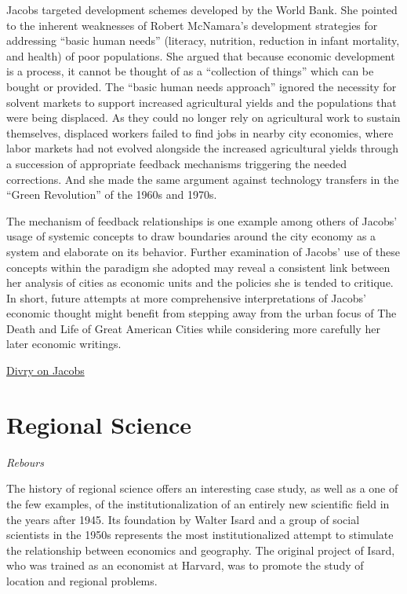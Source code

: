 \documentclass[
]{book}
\begin{document}
Jacobs targeted development schemes developed by the World Bank. She pointed to the inherent weaknesses of Robert McNamara's development strategies for addressing ``basic human needs'' (literacy, nutrition, reduction in infant mortality, and health) of poor populations. She argued that because economic development is a process, it cannot be thought of as a ``collection of things'' which can be bought or provided. The ``basic human needs approach'' ignored the necessity for solvent markets to support increased agricultural yields and the populations that were being displaced. As they could no longer rely on agricultural work to sustain themselves, displaced workers failed to find jobs in nearby city economies, where labor markets had not evolved alongside the increased agricultural yields through a succession of appropriate feedback mechanisms triggering the needed corrections. And she made the same argument against technology transfers in the ``Green Revolution'' of the 1960s and 1970s.

The mechanism of feedback relationships is one example among others of Jacobs' usage of systemic concepts to draw boundaries around the city economy as a system and elaborate on its behavior. Further examination of Jacobs' use of these concepts within the paradigm she adopted may reveal a consistent link between her analysis of cities as economic units and the policies she is tended to critique. In short, future attempts at more comprehensive interpretations of Jacobs' economic thought might benefit from stepping away from the urban focus of The Death and Life of Great American Cities while considering more carefully her later economic writings.

\href{https://hscif.org/economists-in-the-city-divry/}{Divry on Jacobs}

\hypertarget{regional-science}{%
\section{Regional Science}\label{regional-science}}

\emph{Rebours}

The history of regional science offers an interesting case study, as well as a one of the few examples, of the institutionalization of an entirely new scientific field in the years after 1945. Its foundation by Walter Isard and a group of social scientists in the 1950s represents the most institutionalized attempt to stimulate the relationship between economics and geography. The original project of Isard, who was trained as an economist at Harvard, was to promote the study of location and regional problems.
\end{document}
